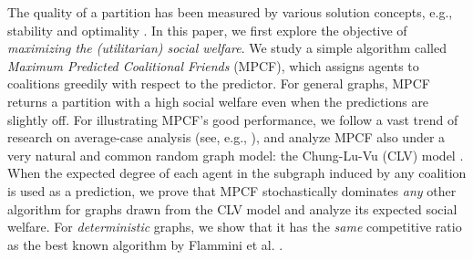 \documentclass[letterpaper]{article} %
\begin{document}


%

The quality of a partition has been measured by various solution concepts, e.g., stability and optimality \cite{brandt2016introduction}. In this paper, we first explore the objective of \textit{maximizing the (utilitarian) social welfare}. We study a simple algorithm called \textit{Maximum Predicted Coalitional Friends} (MPCF), which assigns agents to coalitions greedily with respect to the predictor. For general graphs, MPCF returns a partition with a high social welfare even when the predictions are slightly off. For illustrating MPCF’s good performance, we follow a vast trend of research on average-case analysis (see, e.g., \cite{karp1981maximum,meka2009matrix}), and analyze MPCF also under a very natural and common random graph model: the Chung-Lu-Vu (CLV) model \cite{chung2004spectra}. %
When the expected degree of each agent in the subgraph induced by any coalition is used as a prediction, we prove that MPCF stochastically dominates \textit{any} other algorithm for graphs drawn from the CLV model and analyze its expected social welfare. For \textit{deterministic} graphs, we show that it has the \textit{same} competitive ratio as the best known algorithm by Flammini et al. . %
\end{document}
